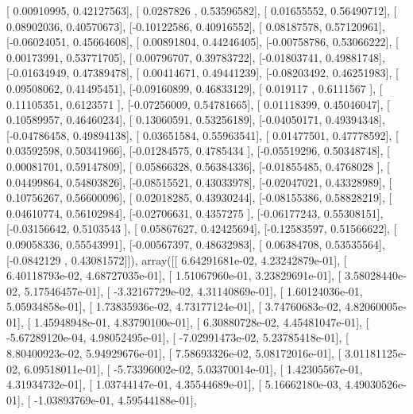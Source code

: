\documentclass{article}
\begin{document}
       [ 0.00910995,  0.42127563],
       [ 0.0287826 ,  0.53596582],
       [ 0.01655552,  0.56490712],
       [ 0.08902036,  0.40570673],
       [-0.10122586,  0.40916552],
       [ 0.08187578,  0.57120961],
       [-0.06024051,  0.45664608],
       [ 0.00891804,  0.44246405],
       [-0.00758786,  0.53066222],
       [ 0.00173991,  0.53771705],
       [ 0.00796707,  0.39783722],
       [-0.01803741,  0.49881748],
       [-0.01634949,  0.47389478],
       [ 0.00414671,  0.49441239],
       [-0.08203492,  0.46251983],
       [ 0.09508062,  0.41495451],
       [-0.09160899,  0.46833129],
       [ 0.019117  ,  0.6111567 ],
       [ 0.11105351,  0.6123571 ],
       [-0.07256009,  0.54781665],
       [ 0.01118399,  0.45046047],
       [ 0.10589957,  0.46460234],
       [ 0.13060591,  0.53256189],
       [-0.04050171,  0.49394348],
       [-0.04786458,  0.49894138],
       [ 0.03651584,  0.55963541],
       [ 0.01477501,  0.47778592],
       [ 0.03592598,  0.50341966],
       [-0.01284575,  0.4785434 ],
       [-0.05519296,  0.50348748],
       [ 0.00081701,  0.59147809],
       [ 0.05866328,  0.56384336],
       [-0.01855485,  0.4768028 ],
       [ 0.04499864,  0.54803826],
       [-0.08515521,  0.43033978],
       [-0.02047021,  0.43328989],
       [ 0.10756267,  0.56600096],
       [ 0.02018285,  0.43930244],
       [-0.08155386,  0.58828219],
       [ 0.04610774,  0.56102984],
       [-0.02706631,  0.4357275 ],
       [-0.06177243,  0.55308151],
       [-0.03156642,  0.5103543 ],
       [ 0.05867627,  0.42425694],
       [-0.12583597,  0.51566622],
       [ 0.09058336,  0.55543991],
       [-0.00567397,  0.48632983],
       [ 0.06384708,  0.53535564],
       [-0.0842129 ,  0.43081572]]), array([[  6.64291681e-02,   4.23242879e-01],
       [  6.40118793e-02,   4.68727035e-01],
       [  1.51067960e-01,   3.23829691e-01],
       [  3.58028440e-02,   5.17546457e-01],
       [ -3.32167729e-02,   4.31140869e-01],
       [  1.60124036e-01,   5.05934858e-01],
       [  1.73835936e-02,   4.73177124e-01],
       [  3.74760683e-02,   4.82060005e-01],
       [  1.45948948e-01,   4.83790100e-01],
       [  6.30880728e-02,   4.45481047e-01],
       [ -5.67289120e-04,   4.98052495e-01],
       [ -7.02991473e-02,   5.23785418e-01],
       [  8.80400923e-02,   5.94929676e-01],
       [  7.58693326e-02,   5.08172016e-01],
       [  3.01181125e-02,   6.09518011e-01],
       [ -5.73396002e-02,   5.03370014e-01],
       [  1.42305567e-01,   4.31934732e-01],
       [  1.03744147e-01,   4.35544689e-01],
       [  5.16662180e-03,   4.49030526e-01],
       [ -1.03893769e-01,   4.59544188e-01],
\end{document}
